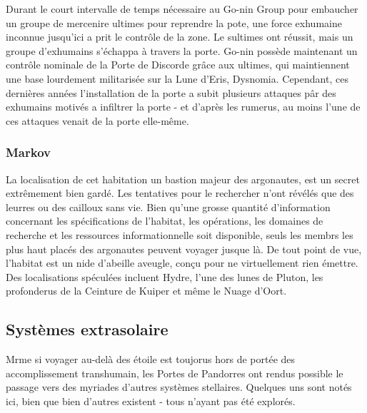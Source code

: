                                                                      Durant le court intervalle de temps nécessaire au Go-nin Group pour embaucher un groupe de mercenire ultimes pour reprendre la pote, une force exhumaine inconnue jusqu'ici a prit le contrôle de la zone. Le sultimes ont réussit, mais un groupe d'exhumains s'échappa à travers la porte. Go-nin possède maintenant un contrôle nominale de la Porte de Discorde grâce aux ultimes, qui maintiennent une base lourdement militarisée sur la Lune d'Eris, Dysnomia. Cependant, ces dernières années l'installation de la porte a subit plusieurs attaques pâr des exhumains motivés a infiltrer la porte - et d'après les rumerus, au moins l'une de ces attaques venait de la porte elle-même. 

                                                                     \subsubsection{Markov} \label{sec:markov} 

                                                                     La localisation de cet habitation un bastion majeur des argonautes, est un secret extrêmement bien gardé. Les tentatives pour le rechercher n'ont révélés que des leurres ou des cailloux sans vie. Bien qu'une grosse quantité d'information concernant les spécifications de l'habitat, les opérations, les domaines de recherche et les ressources informationnelle soit disponible, seuls les membrs les plus haut placés des argonautes peuvent voyager jusque là. De tout point de vue, l'habitat  est un nide d'abeille aveugle, conçu pour ne virtuellement rien émettre. Des localisations spéculées incluent Hydre, l'une des lunes de Pluton, les profonderus de la Ceinture de Kuiper et même le Nuage d'Oort. 

                                                                     \subsection{Systèmes extrasolaire} \label{sec:extrasolar-systems} 

                                                                     Mrme si voyager au-delà des étoile est toujorus hors de portée des accomplissement transhumain, les Portes de Pandorres ont rendus possible le passage vers des myriades d'autres systèmes stellaires. Quelques uns sont notés ici, bien que bien d'autres existent - tous n'ayant pas été explorés. 


